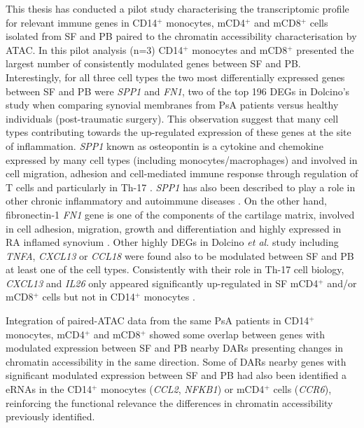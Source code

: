 This thesis has conducted a pilot study characterising the transcriptomic profile for relevant immune genes in CD14$^+$ monocytes, mCD4$^+$ and mCD8$^+$ cells isolated from SF and PB paired to the chromatin accessibility characterisation by ATAC. In this pilot analysis (n=3) CD14$^+$ monocytes and mCD8$^+$ presented the largest number of consistently modulated genes between SF and PB. Interestingly, for all three cell types the two most differentially expressed genes between SF and PB were \textit{SPP1} and \textit{FN1}, two of the top 196 DEGs in Dolcino's study when comparing synovial membranes from PsA patients versus healthy individuals (post-traumatic surgery). This observation suggest that many cell types contributing towards the up-regulated expression of these genes at the site of inflammation. \textit{SPP1} known as osteopontin is a cytokine and chemokine expressed by many cell types (including monocytes/macrophages) and involved in cell migration, adhesion and cell-mediated immune response through regulation of T cells and particularly in Th-17 \parencite{Morimoto2010}. \textit{SPP1} has also been described to play a role in other chronic inflammatory and autoimmune diseases \parencite{Rittling2015}. On the other hand, fibronectin-1 \textit{FN1} gene is one of the components of the cartilage matrix, involved in cell adhesion, migration, growth and differentiation and highly expressed in RA inflamed synovium \parencite{Chang2005}. Other highly DEGs in Dolcino \textit{et al.} study including \textit{TNFA}, \textit{CXCL13} or \textit{CCL18} were found also to be modulated between SF and PB at least one of the cell types. Consistently with their role in Th-17 cell biology, \textit{CXCL13} and \textit{IL26} only appeared significantly up-regulated in SF mCD4$^+$ and/or mCD8$^+$ cells but not in CD14$^+$ monocytes \parencite{Takagi2008}.

Integration of paired-ATAC data from the same PsA patients in CD14$^+$ monocytes, mCD4$^+$ and mCD8$^+$ showed some overlap between genes with modulated expression between SF and PB nearby DARs presenting changes in chromatin accessibility in the same direction. Some of DARs nearby genes with significant modulated expression between SF and PB had also been identified a eRNAs in the CD14$^+$ monocytes (\textit{CCL2}, \textit{NFKB1}) or mCD4$^+$ cells (\textit{CCR6}), reinforcing the functional relevance the differences in chromatin accessibility previously identified. 

